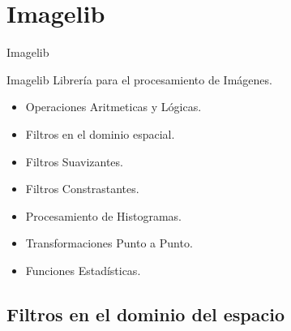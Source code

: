 \documentclass{beamer}
\begin{document}
\section{Imagelib}



\begin{frame}{Imagelib}

\begin{block}{Imagelib}
Librería para el procesamiento de Imágenes.
\end{block}

\begin{itemize}
\item Operaciones Aritmeticas y Lógicas.
\item Filtros en el dominio espacial.
  \item Filtros Suavizantes.
  \item Filtros Constrastantes.
\item Procesamiento de Histogramas.
\item Transformaciones Punto a Punto.
\item Funciones Estadísticas.

\end{itemize}


\end{frame}










\subsection{Filtros en el dominio del espacio}
\end{document}
